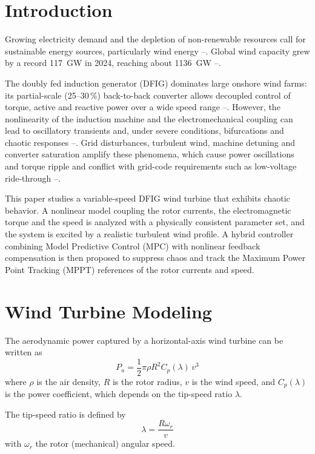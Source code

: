 \documentclass[conference]{IEEEtran}
\begin{document}
\section{Introduction}

Growing electricity demand and the depletion of non-renewable resources call for sustainable energy sources, particularly wind energy \cite{b1}--\cite{b3}. Global wind capacity grew by a record 117~GW in 2024, reaching about 1136~GW \cite{b4}--\cite{b6}.

The doubly fed induction generator (DFIG) dominates large onshore wind farms: its partial-scale (25--30\,\%) back-to-back converter allows decoupled control of torque, active and reactive power over a wide speed range \cite{b7}--\cite{b10}. However, the nonlinearity of the induction machine and the electromechanical coupling can lead to oscillatory transients and, under severe conditions, bifurcations and chaotic responses \cite{b11}--\cite{b15}. Grid disturbances, turbulent wind, machine detuning and converter saturation amplify these phenomena, which cause power oscillations and torque ripple and conflict with grid-code requirements such as low-voltage ride-through \cite{b16}--\cite{b20}.

This paper studies a variable-speed DFIG wind turbine that exhibits chaotic behavior. A nonlinear model coupling the rotor currents, the electromagnetic torque and the speed is analyzed with a physically consistent parameter set, and the system is excited by a realistic turbulent wind profile. A hybrid controller combining Model Predictive Control (MPC) with nonlinear feedback compensation is then proposed to suppress chaos and track the Maximum Power Point Tracking (MPPT) references of the rotor currents and speed.

\section{Wind Turbine Modeling}

The aerodynamic power captured by a horizontal-axis wind turbine can be written as \cite{b21,b22,b23}
\begin{equation}
P_{a} = \frac{1}{2}\pi\rho R^{2}C_{p}(\lambda)\, v^{3}
\label{eq1}
\end{equation}
where $\rho$ is the air density, $R$ is the rotor radius, $v$ is the wind speed, and $C_{p}(\lambda)$ is the power coefficient, which depends on the tip-speed ratio $\lambda$.

The tip-speed ratio is defined by
\begin{equation}
\lambda = \frac{R\omega_{r}}{v}
\label{eq2}
\end{equation}
with $\omega_{r}$ the rotor (mechanical) angular speed.
\end{document}
